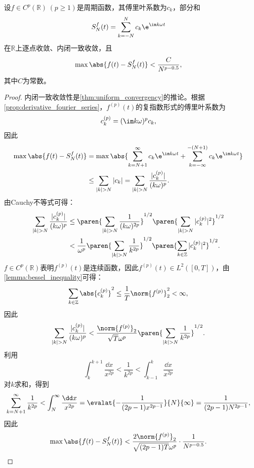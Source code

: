 \begin{theorem}\label{thm:converge_speed}
    设$f\in C^p(\mathbb{R})\ (p\geq 1)$是周期函数，其傅里叶系数为$c_k$，部分和
    \begin{equation}
        S_N^f(t)=\sum_{k=-N}^{N}c_k \e^{\im k\omega t}
    \end{equation}
    在$\mathbb{R}$上逐点收敛、内闭一致收敛，且
    \begin{equation}
        \max\abs{f(t)-S_N^f(t)}<\frac{C}{N^{p-0.5}},
    \end{equation}
    其中$C$为常数。
\end{theorem}
\begin{proof}
    内闭一致收敛性是\cref{thm:uniform_convergency}的推论。根据\cref{prop:derivative_fourier_series}，$f^{(p)}(t)$的复指数形式的傅里叶系数为
    \begin{equation}
        c^{(p)}_k=(\im k\omega)^p c_k,
    \end{equation}
    因此
    \begin{align}
        \max\abs{f(t)-S_N^f(t)}&=\max\abs{\sum_{k=N+1}^{\infty}c_k\e^{\im k\omega t}+\sum_{k=-\infty}^{-(N+1)}c_k\e^{\im k\omega t}} \nonumber \\
        &\leq\sum_{|k|>N}|c_k|=\sum_{|k|>N}\frac{|c_k^{(p)}|}{(k\omega)^p}.
    \end{align}
    由Cauchy不等式可得：
    \begin{align}
        \sum_{|k|>N}\frac{|c_k^{(p)}|}{(k\omega)^p}&\leq\paren{\sum_{|k|>N}\frac{1}{(k\omega)^{2p}}}^{1/2}\paren{\sum_{|k|>N}|c^{(p)}_k|^2}^{1/2} \nonumber \\
        &<\frac{1}{\omega^{p}}\paren{\sum_{|k|>N}\frac{1}{k^{2p}}}^{1/2}\paren{\sum_{k\in\mathbb{Z}}|c^{(p)}_k|^2}^{1/2}.
    \end{align}
    $f\in C^p(\mathbb{R})$表明$f^{(p)}(t)$是连续函数，因此$f^{(p)}(t)\in L^2([0,T])$，由\cref{lemma:bessel_inequality}可得：
    \begin{equation}
        \sum_{k\in\mathbb{Z}}\abs{c^{(p)}_k}^2\leq\frac{1}{T}\norm{f^{(p)}}_2^2<\infty,
    \end{equation}
    因此
    \begin{equation}
        \sum_{|k|>N}\frac{|c_k^{(p)}|}{(k\omega)^p}<\frac{\norm{f^{(p)}}_2}{\sqrt{T}\omega^{p}}\paren{\sum_{|k|>N}\frac{1}{k^{2p}}}^{1/2}.
    \end{equation}
    利用
    \begin{equation}
        \int_{k}^{k+1}\frac{\dd x}{x^{2p}}<\frac{1}{k^{2p}}<\int_{k-1}^{k}\frac{\dd x}{x^{2p}}
    \end{equation}
    对$k$求和，得到
    \begin{equation}
        \sum_{k=N+1}^{\infty}\frac{1}{k^{2p}}<\int_{N}^{\infty}\frac{\dd x}{x^{2p}}=\evalat{-\frac{1}{(2p-1)x^{2p-1}}}{N}{\infty}=\frac{1}{(2p-1)N^{2p-1}},
    \end{equation}
    因此
    \begin{equation}
        \max\abs{f(t)-S_N^f(t)}<\frac{2\norm{f^{(p)}}_2}{\sqrt{(2p-1)T}\omega^{p}}\cdot\frac{1}{N^{p-0.5}}.
    \end{equation}
\end{proof}
